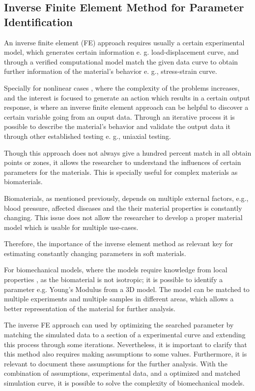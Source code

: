 
\subsection{Inverse Finite Element Method for Parameter Identification}

An inverse finite element (FE) approach requires usually a certain experimental model,
 which generates certain information e. g. load-displacement curve, and through 
a verified computational model match the given data curve to obtain further information 
of the material's behavior e. g., stress-strain curve.

Specially for nonlinear cases \cite{Husain2004}, where the complexity of the problems 
increases, and the interest is focused to generate an action which results in a 
certain output response, is where an inverse finite element approach can be helpful 
to discover a certain variable going from an ouput data. Through an iterative process it is 
possible to describe the material's behavior and validate the output data it 
through other established testing e. g., uniaxial testing.

Though this approach does not always give a hundred percent match in all obtain points 
or zones, it allows the researcher to understand the influences of certain parameters 
for the materials. This is specially useful for complex materials as biomaterials. 

Biomaterials, as mentioned previously, depends on multiple external factors, e.g., blood 
pressure, affected diseases and the their material properties is constantly changing. 
This issue does not allow the researcher to develop a proper material model which is 
usable for multiple use-cases. 

Therefore, the importance of the inverse element method as relevant key for estimating 
constantly changing parameters in soft materials.

For biomechanical models, where the models require knowledge from local properties \cite{Chai2013},
as the biomaterial is not isotropic; it is possible to identify a parameter e.g. Young's Modulus 
from a 3D model. The model can be matched to multiple experiments and multiple samples in different areas,
which allows a better representation of the material for further analysis.

The inverse FE approach can used by optimizing the searched parameter by matching the simulated data
to a section of a experimental curve and extending this process through some iterations. 
Nevertheless, it is important to clarify that this method also requires making assumptions to some values.
Furthermore, it is relevant to document these assumptions for the further analysis. 
With the combination of assumptions, experimental data, and a optimized and matched simulation curve, it
is possible to solve the complexity of biomechanical models.
 
